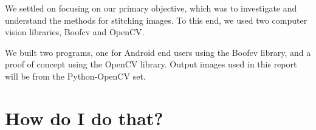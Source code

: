 \documentclass[12pt]{amsart}
\begin{document}
We settled on focusing on our primary objective, which was to investigate and understand the methods for stitching images. To this end, we used two computer vision libraries, Boofcv and OpenCV.

We built two programs, one for Android end users using the Boofcv library, and a proof of concept using the OpenCV library. Output images used in this report will be from the Python-OpenCV set.

\section{How do I do that?}
\end{document}

